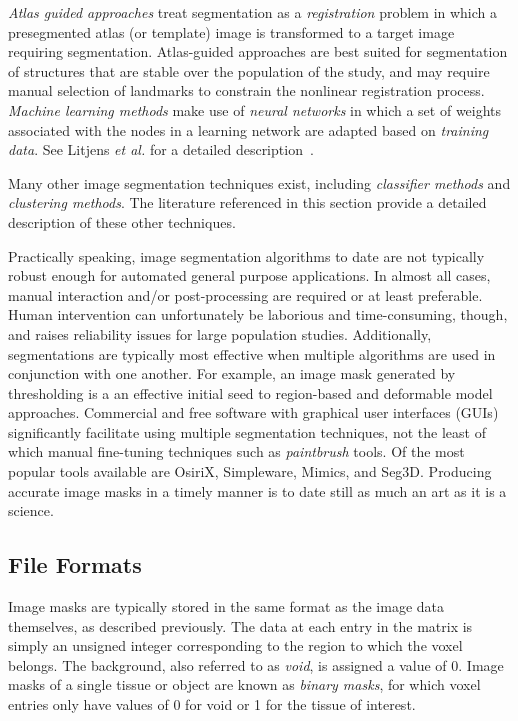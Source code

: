 \textit{Atlas guided approaches} treat segmentation as a \textit{registration} problem in which a presegmented atlas (or template) image is transformed to a target image requiring segmentation. Atlas-guided approaches are best suited for segmentation of structures that are stable over the population of the study, and may require manual selection of landmarks to constrain the nonlinear registration process. \textit{Machine learning methods} make use of \textit{neural networks} in which a set of weights associated with the nodes in a learning network are adapted based on \textit{training data}. See Litjens \textit{et al.} for a detailed description~\cite{litjens_2017}.

Many other image segmentation techniques exist, including \textit{classifier methods} and \textit{clustering methods}. The literature referenced in this section provide a detailed description of these other techniques.

Practically speaking, image segmentation algorithms to date are not typically robust enough for automated general purpose applications. In almost all cases, manual interaction and/or post-processing are required or at least preferable. Human intervention can unfortunately be laborious and time-consuming, though, and raises reliability issues for large population studies. Additionally, segmentations are typically most effective when multiple algorithms are used in conjunction with one another. For example, an image mask generated by thresholding is a an effective initial seed to region-based and deformable model approaches. Commercial and free software with graphical user interfaces (GUIs) significantly facilitate using multiple segmentation techniques, not the least of which manual fine-tuning techniques such as \textit{paintbrush} tools. Of the most popular tools available are OsiriX, Simpleware, Mimics, and Seg3D. Producing accurate image masks in a timely manner is to date still as much an art as it is a science.

\subsection{File Formats}
\label{Data Format-SEG}

Image masks are typically stored in the same format as the image data themselves, as described previously. The data at each entry in the matrix is simply an unsigned integer corresponding to the region to which the voxel belongs. The background, also referred to as \textit{void}, is assigned a value of 0. Image masks of a single tissue or object are known as \textit{binary masks}, for which voxel entries only have values of 0 for void or 1 for the tissue of interest.
